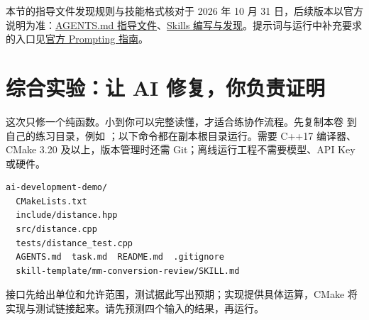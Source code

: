 本节的指导文件发现规则与技能格式核对于 2026 年 10 月 31 日，后续版本以官方说明为准：\href{https://learn.chatgpt.com/docs/agent-configuration/agents-md}{AGENTS.md 指导文件}、\href{https://learn.chatgpt.com/docs/build-skills}{Skills 编写与发现}。提示词与运行中补充要求的入口见\href{https://learn.chatgpt.com/docs/prompting}{官方 Prompting 指南}。

\section{综合实验：让 AI 修复，你负责证明}
\label{sec:ai-lab}

这次只修一个纯函数。小到你可以完整读懂，才适合练协作流程。先复制本卷  到自己的练习目录，例如 ；以下命令都在副本根目录运行。需要 C++17 编译器、CMake 3.20 及以上，版本管理时还需 Git；离线运行工程不需要模型、API Key 或硬件。

\begin{lstlisting}[language={}]
ai-development-demo/
  CMakeLists.txt
  include/distance.hpp
  src/distance.cpp
  tests/distance_test.cpp
  AGENTS.md  task.md  README.md  .gitignore
  skill-template/mm-conversion-review/SKILL.md
\end{lstlisting}
接口先给出单位和允许范围，测试据此写出预期；实现提供具体运算，CMake 将实现与测试链接起来。请先预测四个输入的结果，再运行。


\noindent\begin{minipage}{\linewidth}

\end{minipage}\par
{}


